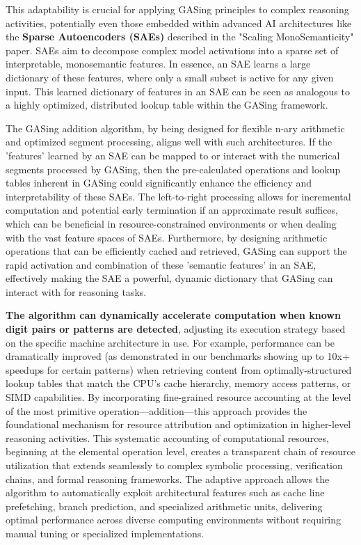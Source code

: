 \documentclass[11pt,a4paper]{article}
\begin{document}
This adaptability is crucial for applying GASing principles to complex reasoning activities, potentially even those embedded within advanced AI architectures like the \textbf{Sparse Autoencoders (SAEs)} described in the "Scaling MonoSemanticity" paper. SAEs aim to decompose complex model activations into a sparse set of interpretable, monosemantic features. In essence, an SAE learns a large dictionary of these features, where only a small subset is active for any given input. This learned dictionary of features in an SAE can be seen as analogous to a highly optimized, distributed lookup table within the GASing framework. 

The GASing addition algorithm, by being designed for flexible n-ary arithmetic and optimized segment processing, aligns well with such architectures. If the 'features' learned by an SAE can be mapped to or interact with the numerical segments processed by GASing, then the pre-calculated operations and lookup tables inherent in GASing could significantly enhance the efficiency and interpretability of these SAEs. The left-to-right processing allows for incremental computation and potential early termination if an approximate result suffices, which can be beneficial in resource-constrained environments or when dealing with the vast feature spaces of SAEs. Furthermore, by designing arithmetic operations that can be efficiently cached and retrieved, GASing can support the rapid activation and combination of these 'semantic features' in an SAE, effectively making the SAE a powerful, dynamic dictionary that GASing can interact with for reasoning tasks.

\textbf{The algorithm can dynamically accelerate computation when known digit pairs or patterns are detected}, adjusting its execution strategy based on the specific machine architecture in use. For example, performance can be dramatically improved (as demonstrated in our benchmarks showing up to 10x+ speedups for certain patterns) when retrieving content from optimally-structured lookup tables that match the CPU's cache hierarchy, memory access patterns, or SIMD capabilities. By incorporating fine-grained resource accounting at the level of the most primitive operation—addition—this approach provides the foundational mechanism for resource attribution and optimization in higher-level reasoning activities. This systematic accounting of computational resources, beginning at the elemental operation level, creates a transparent chain of resource utilization that extends seamlessly to complex symbolic processing, verification chains, and formal reasoning frameworks. The adaptive approach allows the algorithm to automatically exploit architectural features such as cache line prefetching, branch prediction, and specialized arithmetic units, delivering optimal performance across diverse computing environments without requiring manual tuning or specialized implementations.
\end{document}
